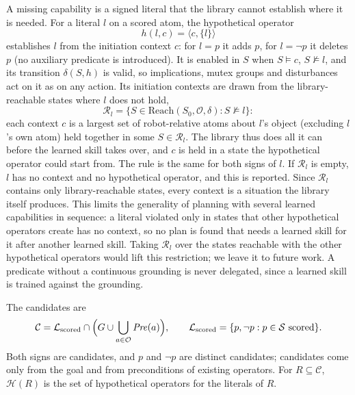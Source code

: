 A missing capability is a signed literal that the library cannot establish where it
is needed. For a literal $l$ on a scored atom, the hypothetical operator
\begin{equation}
  h(l,c)=\langle c,\{l\}\rangle
\end{equation}
establishes $l$ from the initiation context $c$: for $l=p$ it adds $p$, for $l=\neg p$
it deletes $p$ (no auxiliary predicate is introduced). It is enabled in $S$ when
$S\models c$, $S\not\models l$, and its transition $\delta(S,h)$ is valid, so
implications, mutex groups and disturbances act on it as on any action. Its initiation
contexts are drawn from the library-reachable states where $l$ does not hold,
\begin{equation}
  \mathcal{R}_l=\{S\in\mathrm{Reach}(S_0,\mathcal{O},\delta) : S\not\models l\}:
\end{equation}
each context $c$ is a largest set of robot-relative atoms about $l$'s object (excluding
$l$'s own atom) held together in some $S\in\mathcal{R}_l$. The library thus does all it can
before the learned skill takes over, and $c$ is held in a state the hypothetical operator
could start from. The rule is the same for both signs of $l$. If $\mathcal{R}_l$ is empty,
$l$ has no context and no hypothetical operator, and this is reported.
Since $\mathcal{R}_l$ contains only library-reachable states, every context is a situation
the library itself produces. This limits the generality of planning with several learned
capabilities in sequence: a literal violated only in states that other hypothetical
operators create has no context, so no plan is found that needs a learned skill for it
after another learned skill. Taking $\mathcal{R}_l$ over the states reachable with the
other hypothetical operators would lift this restriction; we leave it to future work.
A predicate without a continuous grounding is never delegated, since a learned skill is
trained against the grounding.

The candidates are
\begin{equation}
  \mathcal{C}=\mathcal{L}_{\mathrm{scored}}\cap\Bigl(G\cup\bigcup_{a\in\mathcal{O}}\mathit{Pre}(a)\Bigr),
  \qquad \mathcal{L}_{\mathrm{scored}}=\{p,\neg p : p\in\mathcal{S}\text{ scored}\}.
\end{equation}
Both signs are candidates, and $p$ and $\neg p$ are distinct candidates; candidates come
only from the goal and from preconditions of existing operators. For $R\subseteq\mathcal{C}$,
$\mathcal{H}(R)$ is the set of hypothetical operators for the literals of $R$.

